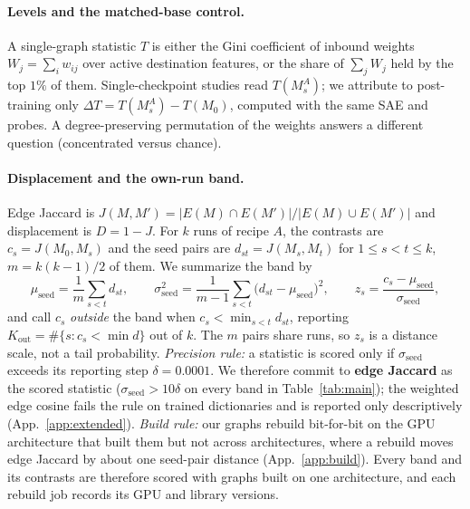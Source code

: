 \documentclass{article}
\begin{document}
\paragraph{Levels and the matched-base control.} A single-graph statistic $T$ is either the Gini coefficient of inbound weights $W_j=\sum_i w_{ij}$ over active destination features, or the share of $\sum_j W_j$ held by the top $1\%$ of them. Single-checkpoint studies read $T(M^A_s)$; we attribute to post-training only $\Delta T=T(M^A_s)-T(M_0)$, computed with the same SAE and probes. A degree-preserving permutation of the weights answers a different question (concentrated versus chance).

\paragraph{Displacement and the own-run band.} Edge Jaccard is $J(M,M')=|E(M)\cap E(M')|/|E(M)\cup E(M')|$ and displacement is $D=1-J$. For $k$ runs of recipe $A$, the contrasts are $c_s=J(M_0,M_s)$ and the seed pairs are $d_{st}=J(M_s,M_t)$ for $1\le s<t\le k$, $m=k(k-1)/2$ of them. We summarize the band by
\begin{equation}
\mu_{\mathrm{seed}}=\frac1m\sum_{s<t}d_{st},\qquad
\sigma^2_{\mathrm{seed}}=\frac{1}{m-1}\sum_{s<t}\big(d_{st}-\mu_{\mathrm{seed}}\big)^2,\qquad
z_s=\frac{c_s-\mu_{\mathrm{seed}}}{\sigma_{\mathrm{seed}}},
\label{eq:band}
\end{equation}
and call $c_s$ \emph{outside} the band when $c_s<\min_{s<t}d_{st}$, reporting $K_{\mathrm{out}}=\#\{s:c_s<\min d\}$ out of $k$. The $m$ pairs share runs, so $z_s$ is a distance scale, not a tail probability. \emph{Precision rule:} a statistic is scored only if $\sigma_{\mathrm{seed}}$ exceeds its reporting step $\delta=0.0001$. We therefore commit to \textbf{edge Jaccard} as the scored statistic ($\sigma_{\mathrm{seed}}>10\delta$ on every band in Table~\ref{tab:main}); the weighted edge cosine fails the rule on trained dictionaries and is reported only descriptively (App.~\ref{app:extended}). \emph{Build rule:} our graphs rebuild bit-for-bit on the GPU architecture that built them but not across architectures, where a rebuild moves edge Jaccard by about one seed-pair distance (App.~\ref{app:build}). Every band and its contrasts are therefore scored with graphs built on one architecture, and each rebuild job records its GPU and library versions.
\end{document}
